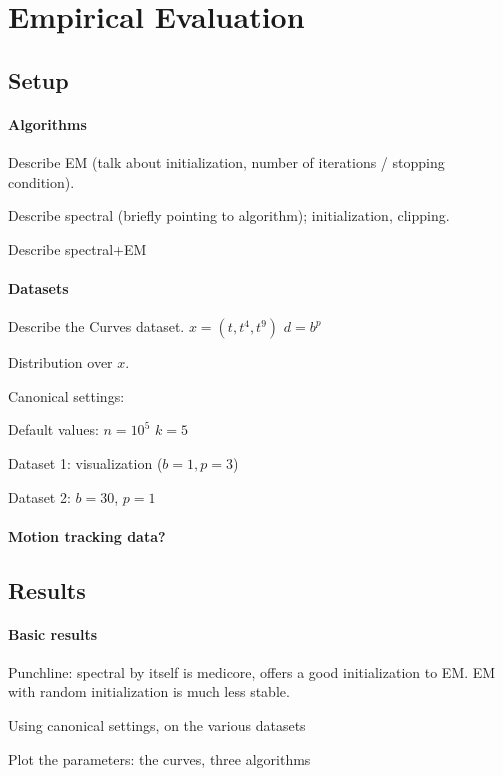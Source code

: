 \section{Empirical Evaluation}
\label{sec:evaluation}

\subsection{Setup}

\paragraph{Algorithms}

Describe EM (talk about initialization, number of iterations / stopping
condition).

Describe spectral (briefly pointing to algorithm);
initialization, clipping.

Describe spectral+EM

\paragraph{Datasets}
Describe the Curves dataset.
$x = (t, t^4, t^9)$
$d = b^p$

Distribution over $x$.

Canonical settings:

Default values:
$n = 10^5$
$k = 5$

Dataset 1: visualization ($b = 1, p = 3$)

Dataset 2: $b = 30$, $p = 1$

\paragraph{Motion tracking data?}

\subsection{Results}

\paragraph{Basic results}

Punchline: spectral by itself is medicore, offers a good initialization to EM.
EM with random initialization is much less stable.

Using canonical settings, on the various datasets

Plot the parameters: the curves, three algorithms

